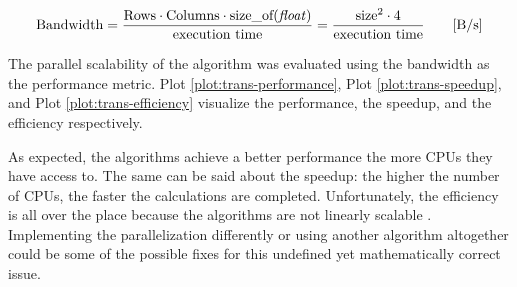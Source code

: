 \begin{equation}
    \label{eq:bandwidth}
    \textnormal{Bandwidth}=
        \frac{%
            \textnormal{Rows} \cdot \textnormal{Columns} \cdot %
            \textnormal{size\_of(\textit{float})}
            }
            {\textnormal{execution time}}=\frac{\textnormal{size}^2\cdot 4}
                                               {\textnormal{execution time}}
        \qquad \textnormal{[B/s]}
\end{equation}




The parallel scalability of the algorithm was evaluated using the bandwidth as %
the performance metric. Plot \ref{plot:trans-performance}, Plot \ref{plot:trans-speedup}, %
and Plot \ref{plot:trans-efficiency} visualize the performance, the speedup, and %
the efficiency respectively. 





As expected, the algorithms achieve a better performance the more CPUs they have %
access to. The same can be said about the speedup: the higher the number of %
CPUs, the faster the calculations are completed. Unfortunately, the efficiency is %
all over the place because the algorithms are not linearly scalable \cite{scalability}. %
Implementing the parallelization differently or using another algorithm altogether %
could be some of the possible fixes for this undefined yet mathematically correct %
issue.